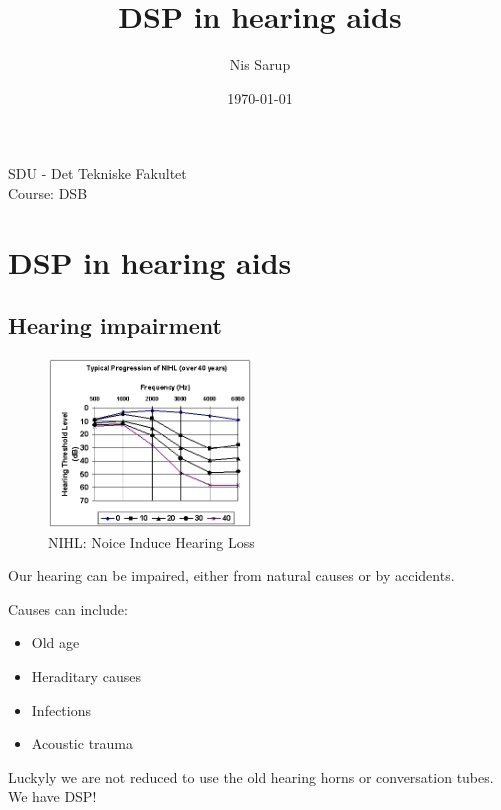 \documentclass[a4wide,10pt]{article}
\begin{document}
\title{DSP in hearing aids}
\author{Nis Sarup}
\date{\today}
\maketitle
\begin{center}
	SDU - Det Tekniske Fakultet\\
	Course: DSB\\
\end{center}
\newpage

\section{DSP in hearing aids} %
\label{sec:dsp_in_hearing_aids}

\subsection{Hearing impairment} %
\label{sub:hearing_impairment}
\begin{figure}
  \begin{center}
    \includegraphics[width=0.48\textwidth]{images/nihl_graph.jpg}
  \end{center}
  \caption{NIHL: Noice Induce Hearing Loss}
\end{figure}
Our hearing can be impaired, either from natural causes or by accidents.


Causes can include:

\begin{itemize}
	\item Old age
	\item Heraditary causes
	\item Infections
	\item Acoustic trauma
\end{itemize}

Luckyly we are not reduced to use the old hearing horns or conversation tubes. We have DSP!

\end{document}
